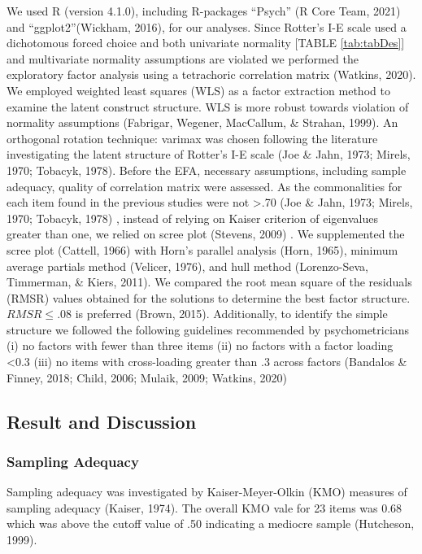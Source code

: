 \documentclass[
  man]{apa6}
\begin{document}
We used R (version 4.1.0), including R-packages ``Psych'' (R Core Team, 2021) and ``ggplot2''(Wickham, 2016), for our analyses. Since Rotter's I-E scale used a dichotomous forced choice and both univariate normality {[}TABLE \ref{tab:tabDes}{]} and multivariate normality assumptions are violated we performed the exploratory factor analysis using a tetrachoric correlation matrix (Watkins, 2020). We employed weighted least squares (WLS) as a factor extraction method to examine the latent construct structure. WLS is more robust towards violation of normality assumptions (Fabrigar, Wegener, MacCallum, \& Strahan, 1999). An orthogonal rotation technique: varimax was chosen following the literature investigating the latent structure of Rotter's I-E scale (Joe \& Jahn, 1973; Mirels, 1970; Tobacyk, 1978). Before the EFA, necessary assumptions, including sample adequacy, quality of correlation matrix were assessed. As the commonalities for each item found in the previous studies were not \textgreater.70 (Joe \& Jahn, 1973; Mirels, 1970; Tobacyk, 1978) , instead of relying on Kaiser criterion of eigenvalues greater than one, we relied on scree plot (Stevens, 2009) . We supplemented the scree plot (Cattell, 1966) with Horn's parallel analysis (Horn, 1965), minimum average partials method (Velicer, 1976), and hull method (Lorenzo-Seva, Timmerman, \& Kiers, 2011). We compared the root mean square of the residuals (RMSR) values obtained for the solutions to determine the best factor structure. \(RMSR \le .08\) is preferred (Brown, 2015). Additionally, to identify the simple structure we followed the following guidelines recommended by psychometricians (i) no factors with fewer than three items (ii) no factors with a factor loading \textless0.3 (iii) no items with cross-loading greater than .3 across factors (Bandalos \& Finney, 2018; Child, 2006; Mulaik, 2009; Watkins, 2020)

\hypertarget{result-and-discussion}{%
\subsection{Result and Discussion}\label{result-and-discussion}}

\hypertarget{sampling-adequacy}{%
\subsubsection{Sampling Adequacy}\label{sampling-adequacy}}

Sampling adequacy was investigated by Kaiser-Meyer-Olkin (KMO) measures of sampling adequacy (Kaiser, 1974). The overall KMO vale for 23 items was 0.68 which was above the cutoff value of .50 indicating a mediocre sample (Hutcheson, 1999).
\end{document}
